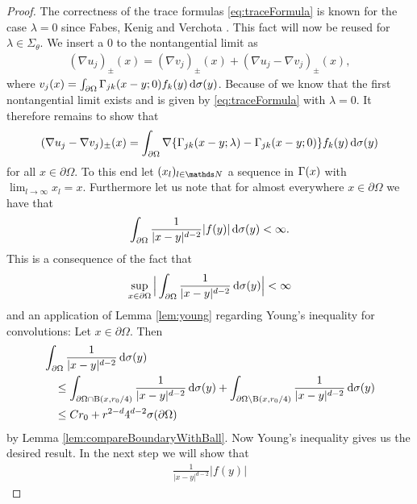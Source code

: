 \begin{proof}
  The correctness of the trace formulas \eqref{eq:traceFormula} is known for the case $\lambda = 0$ since Fabes, Kenig and Verchota \cite{fabesKenigVerchota}.
  This fact will now be reused for $\lambda \in \Sigma_\theta$.
  We insert a $0$ to the nontangential limit as
  \begin{align*}
    (\nabla u_j)_\pm(x) = 
    (\nabla v_j)_\pm(x) + (\nabla u_j - \nabla v_j)_\pm(x),
  \end{align*}
  where $v_j(x) = \int_{\partial\Omega} \Gamma_{jk}(x - y; 0) f_k(y) \, {\operatorname{d}\!{\sigma}}(y)$.
  Because of \cite{fabesKenigVerchota} we know that the first nontangential limit exists and is given by \eqref{eq:traceFormula} with $\lambda = 0$.
  It therefore remains to show that
  \begin{align*}
    (\nabla u_j - \nabla v_j)_\pm(x) = \int_{\partial\Omega} \nabla \{ \Gamma_{jk}(x - y; \lambda) - \Gamma_{jk}(x - y; 0) \} f_k(y) \, {\operatorname{d}\!{\sigma}}(y)
  \end{align*}
  for all $x \in \partial \Omega$.
  To this end let $(x_l)_{l \in \N}$ a sequence in $\Gamma(x)$ with $\lim_{l \to \infty} x_l = x$.
  Furthermore let us note that for almost everywhere $x \in \partial\Omega$ we have that 
  \begin{align*}
    \int_{\partial\Omega} \frac{1}{|x - y|^{d - 2}} |f(y)| \, {\operatorname{d}\!{\sigma}}(y) < \infty.
  \end{align*}
  This is a consequence of the fact that
  \begin{align*}
    \sup_{x \in \partial\Omega} \Big| \int_{\partial\Omega} \frac{1}{|x - y|^{d - 2}} \, {\operatorname{d}\!{\sigma}}(y) \Big| < \infty
  \end{align*}
  and an application of Lemma \ref{lem:young} regarding Young's inequality for convolutions:
  Let $x \in \partial\Omega$.
  Then
  \begin{align*}
    &\int_{\partial\Omega} \frac{1}{|x - y|^{d - 2}} \, {\operatorname{d}\!{\sigma}}(y) \\
    &\quad\leq \int_{\partial\Omega \cap \mathrm{B}(x,r_0/4)} \frac{1}{|x - y|^{d - 2}} \, {\operatorname{d}\!{\sigma}}(y) + \int_{\partial\Omega \setminus \mathrm{B}(x, r_0/4)} \frac{1}{|x - y|^{d - 2}} \, {\operatorname{d}\!{\sigma}}(y) \\
    &\quad\leq C r_0 + r^{2 - d} 4^{d - 2} \sigma(\partial\Omega)
  \end{align*}
  by Lemma \ref{lem:compareBoundaryWithBall}.
  Now Young's inequality gives us the desired result.
  In the next step we will show that
  \begin{align*}
    \frac{1}{|x -y|^{d - 2}} |f(y)|

\end{align*}
\end{proof}
